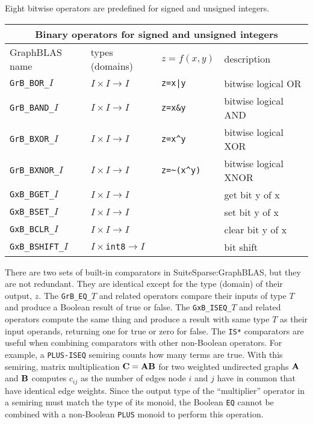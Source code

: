 \documentclass[12pt]{article}
\begin{document}
Eight bitwise operators are predefined for signed and unsigned integers.

\vspace{0.2in}
{\footnotesize
\begin{tabular}{|llll|}
\hline
\multicolumn{4}{|c|}{Binary operators for signed and unsigned integers} \\
\hline
GraphBLAS name        & types (domains)            & $z=f(x,y)$      & description \\
\hline
\verb'GrB_BOR_'$I$    & $I \times I \rightarrow I$ & \verb'z=x|y'    & bitwise logical OR \\
\verb'GrB_BAND_'$I$   & $I \times I \rightarrow I$ & \verb'z=x&y'    & bitwise logical AND \\
\verb'GrB_BXOR_'$I$   & $I \times I \rightarrow I$ & \verb'z=x^y'    & bitwise logical XOR \\
\verb'GrB_BXNOR_'$I$  & $I \times I \rightarrow I$ & \verb'z=~(x^y)' & bitwise logical XNOR \\
\hline
\verb'GxB_BGET_'$I$    & $I \times I \rightarrow I$  & & get bit y of x \\
\verb'GxB_BSET_'$I$    & $I \times I \rightarrow I$  & & set bit y of x \\
\verb'GxB_BCLR_'$I$    & $I \times I \rightarrow I$  & & clear bit y of x \\
\verb'GxB_BSHIFT_'$I$  & $I \times $\verb'int8'$  \rightarrow I$ & & bit shift \\
\hline
\end{tabular}
}
\vspace{0.2in}

There are two sets of built-in comparators in SuiteSparse:Graph\-BLAS,
but they are not redundant.  They are identical except for the type (domain) of
their output, $z$.  The \verb'GrB_EQ_'$T$ and related operators compare their
inputs of type $T$ and produce a Boolean result of true or false.  The
\verb'GxB_ISEQ_'$T$ and related operators compute the same thing and produce a
result with same type $T$ as their input operands, returning one for true or
zero for false.  The \verb'IS*' comparators are useful when combining
comparators with other non-Boolean operators.  For example, a \verb'PLUS-ISEQ'
semiring counts how many terms are true.  With this semiring,
matrix multiplication ${\bf C=AB}$ for two weighted undirected graphs ${\bf A}$
and ${\bf B}$ computes $c_{ij}$ as the number of edges node $i$ and $j$ have in
common that have identical edge weights.  Since the output type of the
``multiplier'' operator in a semiring must match the type of its monoid, the
Boolean \verb'EQ' cannot be combined with a non-Boolean \verb'PLUS' monoid to
perform this operation.
\end{document}
